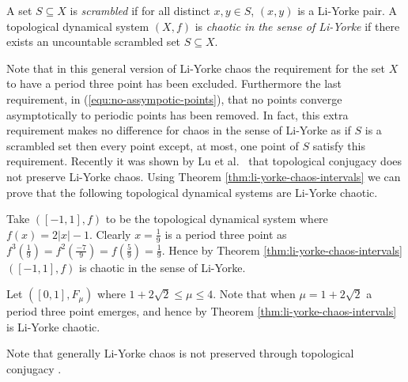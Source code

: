 \begin{defn}  \label{defn:scrambled-set}
    A set $S \subseteq X$ is \emph{scrambled} if for all distinct $x, y \in S$, $(x, y)$ is a Li-Yorke pair. A topological dynamical system $(X, f)$ is \emph{chaotic in the sense of Li-Yorke} if there exists an uncountable scrambled set $S \subseteq X$.
\end{defn}

Note that in this general version of Li-Yorke chaos the requirement for the set $X$ to have a period three point has been excluded. Furthermore the last requirement, in (\ref{equ:no-assympotic-points}), that no points converge asymptotically to periodic points has been removed. In fact, this extra requirement makes no difference for chaos in the sense of Li-Yorke as if $S$ is a scrambled set then every point except, at most, one point of $S$ satisfy this requirement. Recently it was shown by Lu et al.\ \cite{lu-zhu-wu} that topological conjugacy does not preserve Li-Yorke chaos. Using Theorem \ref{thm:li-yorke-chaos-intervals} we can prove that the following topological dynamical systems are Li-Yorke chaotic.

\begin{exmp}
    Take $([-1, 1], f)$ to be the topological dynamical system where $f(x) = 2 |x| - 1$. Clearly $x = \frac{1}{9}$ is a period three point as $f^3\left(\frac{1}{9}\right) = f^2\left(\frac{-7}{9}\right) = f\left(\frac{5}{9}\right) = \frac{1}{9}$. Hence by Theorem \ref{thm:li-yorke-chaos-intervals} $([-1, 1], f)$ is chaotic in the sense of Li-Yorke.
\end{exmp}

\begin{exmp}
    Let $([0, 1], F_\mu)$ where $1 + 2\sqrt{2} \leq \mu \leq 4$. Note that when $\mu = 1 + 2\sqrt{2}$ a period three point emerges, and hence by Theorem \ref{thm:li-yorke-chaos-intervals} is Li-Yorke chaotic.
\end{exmp}

Note that generally Li-Yorke chaos is not preserved through topological conjugacy \cite{wang}.

